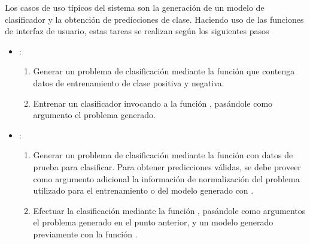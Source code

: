 Los casos de uso típicos del sistema son la generación de un modelo de
clasificador y la obtención de predicciones de clase.
Haciendo uso de las funciones de interfaz de usuario, estas tareas se
realizan según los siguientes pasos
%
\begin{itemize}
\item
  :
  \begin{enumerate}
  \item
    Generar un problema de clasificación mediante la función
     que contenga datos de entrenamiento de clase
    positiva y negativa.
  \item
    Entrenar un clasificador invocando a la función
    , pasándole como argumento el problema
    generado.
  \end{enumerate}
\item
  :
  \begin{enumerate}
  \item
    Generar un problema de clasificación mediante la función
     con datos de prueba para clasificar.
    Para obtener predicciones válidas, se debe proveer como argumento
    adicional la información de normalización del problema utilizado
    para el entrenamiento o del modelo generado con
    .
  \item
    Efectuar la clasificación mediante la función
    , pasándole como argumentos el problema
    generado en el punto anterior, y un modelo generado previamente
    con la función .
  \end{enumerate}
\end{itemize}
%
